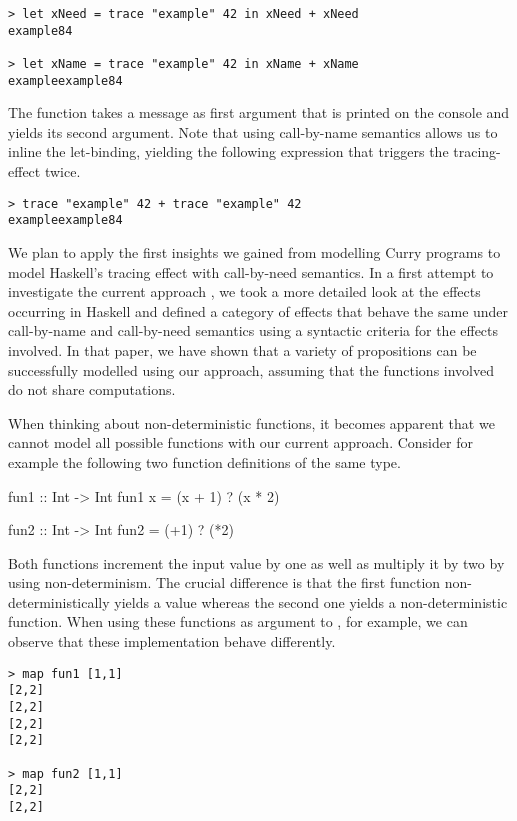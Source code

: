\begin{verbatim}
> let xNeed = trace "example" 42 in xNeed + xNeed
example84

> let xName = trace "example" 42 in xName + xName
exampleexample84
\end{verbatim}

The function  takes a message as first argument that is printed on the console and yields its second argument.
Note that using call\--by\--name semantics allows us to inline the let\--binding, yielding the following expression that triggers the tracing\--effect twice.

\begin{verbatim}
> trace "example" 42 + trace "example" 42
exampleexample84
\end{verbatim}

We plan to apply the first insights we gained from modelling Curry programs to model Haskell's tracing effect with call\--by\--need semantics.
In a first attempt to investigate the current approach \citep{christiansen2019verifying}, we took a more detailed look at the effects occurring in Haskell and defined a category of effects that behave the same under call\--by\--name and call\--by\--need semantics using a syntactic criteria for the effects involved.
In that paper, we have shown that a variety of propositions can be successfully modelled using our approach, assuming that the functions involved do not share computations.

When thinking about non\--deterministic functions, it becomes apparent that we cannot model all possible functions with our current approach.
Consider for example the following two function definitions of the same type.

\begin{curry}
fun1 :: Int -> Int
fun1 x = (x + 1) ? (x * 2)

fun2 :: Int -> Int
fun2 = (+1) ? (*2)
\end{curry}

Both functions increment the input value by one as well as multiply it by two by using non\--determinism.
The crucial difference is that the first function non\--deterministically yields a value whereas the second one yields a non\--deterministic function.
When using these functions as argument to , for example, we can observe that these implementation behave differently.

\begin{verbatim}
> map fun1 [1,1]
[2,2]
[2,2]
[2,2]
[2,2]

> map fun2 [1,1]
[2,2]
[2,2]
\end{verbatim}

